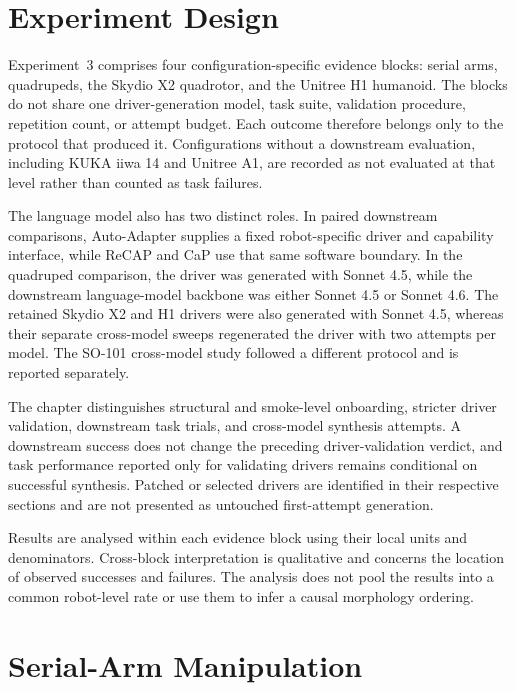 \section[Experiment Design]{Experiment Design}
\label{sec:cross-robot-experiment-design}

Experiment~3 comprises four configuration-specific evidence blocks: serial
arms, quadrupeds, the Skydio X2 quadrotor, and the Unitree H1 humanoid. The
blocks do not share one driver-generation model, task suite, validation
procedure, repetition count, or attempt budget. Each outcome therefore belongs
only to the protocol that produced it. Configurations without a downstream
evaluation, including KUKA iiwa 14 and Unitree A1, are recorded as not
evaluated at that level rather than counted as task failures.

The language model also has two distinct roles. In paired downstream
comparisons, Auto-Adapter supplies a fixed robot-specific driver and capability
interface, while ReCAP and CaP use that same software boundary. In the
quadruped comparison, the driver was generated with Sonnet 4.5, while the
downstream language-model backbone was either Sonnet 4.5 or Sonnet 4.6. The
retained Skydio X2 and H1 drivers were also generated with Sonnet 4.5, whereas
their separate cross-model sweeps regenerated the driver with two attempts per
model. The SO-101 cross-model study followed a different protocol and is
reported separately.

The chapter distinguishes structural and smoke-level onboarding, stricter
driver validation, downstream task trials, and cross-model synthesis attempts.
A downstream success does not change the preceding driver-validation verdict,
and task performance reported only for validating drivers remains conditional
on successful synthesis. Patched or selected drivers are identified in their
respective sections and are not presented as untouched first-attempt
generation.

Results are analysed within each evidence block using their local units and
denominators. Cross-block interpretation is qualitative and concerns the
location of observed successes and failures. The analysis does not pool the
results into a common robot-level rate or use them to infer a causal morphology
ordering.


\section[Serial-Arm Manipulation]{Serial-Arm Manipulation}
\label{sec:cross-robot-serial-arms}

